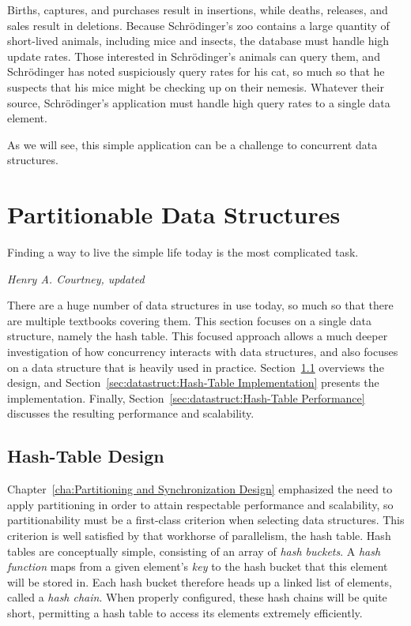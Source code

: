 Births, captures, and purchases result in insertions, while deaths,
releases, and sales result in deletions.
Because Schr\"odinger's zoo contains a large quantity of short-lived
animals, including mice and insects, the database must handle
high update rates.
Those interested in Schr\"odinger's animals can query them, and
Schr\"odinger has noted suspiciously query rates for his cat, so much
so that he suspects that his mice might be checking up on their nemesis.
Whatever their source, Schr\"odinger's application must handle high
query rates to a single data element.

As we will see, this simple application can be a challenge to concurrent
data structures.

\section{Partitionable Data Structures}
\label{sec:datastruct:Partitionable Data Structures}
%
\epigraph{Finding a way to live the simple life today is the most
	  complicated task.}
	 {\emph{Henry A. Courtney, updated}}

There are a huge number of data structures in use today, so much so
that there are multiple textbooks covering them.
This section focuses on a single data structure, namely the hash table.
This focused approach allows a much deeper investigation of how concurrency
interacts with data structures, and also focuses on a data structure
that is heavily used in practice.
Section~\ref{sec:datastruct:Hash-Table Design}
overviews the design, and
Section~\ref{sec:datastruct:Hash-Table Implementation}
presents the implementation.
Finally,
Section~\ref{sec:datastruct:Hash-Table Performance}
discusses the resulting performance and scalability.

\subsection{Hash-Table Design}
\label{sec:datastruct:Hash-Table Design}

Chapter~\ref{cha:Partitioning and Synchronization Design}
emphasized the need to apply partitioning in order to attain
respectable performance and scalability, so partitionability
must be a first-class criterion when selecting data structures.
This criterion is well satisfied by that workhorse of parallelism,
the hash table.
Hash tables are conceptually simple, consisting of an array of
\emph{hash buckets}.
A \emph{hash function} maps from a given element's \emph{key}
to the hash bucket that this element will be stored in.
Each hash bucket therefore heads up a linked list of elements,
called a \emph{hash chain}.
When properly configured, these hash chains will be quite short,
permitting a hash table to access its elements extremely efficiently.

